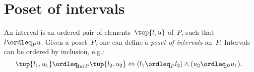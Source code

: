 
\section{Poset of intervals}
\begin{definition}
    \label{def:poset_intervals}
    An interval is an ordered pair of elements~$\tup{l,u}$ of~$P$, such that~$l\ordleq_P u$. Given a poset~$P$, one can define a \emph{poset of intervals} on~$P$. Intervals can be ordered by inclusion, e.g.:
    \begin{equation*}
        \tup{l_1,u_1}\ordleq_{\mathrm{Int} P}\tup{l_2,u_2} \Leftrightarrow (l_1\ordleq_P l_2)\wedge (u_2\ordleq_P u_1).
    \end{equation*}
\end{definition}
